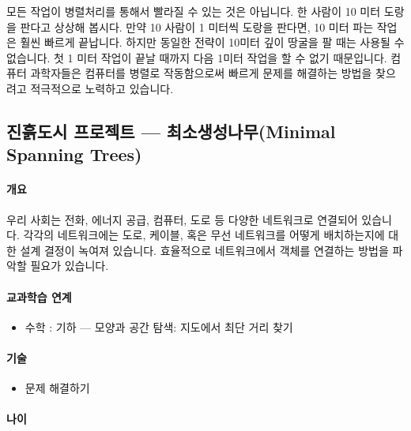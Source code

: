 \documentclass[]{article}
\begin{document}
모든 작업이 병렬처리를 통해서 빨라질 수 있는 것은 아닙니다. 한 사람이 10
미터 도랑을 판다고 상상해 봅시다. 만약 10 사람이 1 미터씩 도랑을 판다면,
10 미터 파는 작업은 훨씬 빠르게 끝납니다. 하지만 동일한 전략이 10미터
깊이 땅굴을 팔 때는 사용될 수 없습니다. 첫 1 미터 작업이 끝날 때까지
다음 1미터 작업을 할 수 없기 때문입니다. 컴퓨터 과학자들은 컴퓨터를
병렬로 작동함으로써 빠르게 문제를 해결하는 방법을 찾으려고 적극적으로
노력하고 있습니다.

\subsection{진흙도시 프로젝트 --- 최소생성나무(Minimal Spanning
Trees)}\label{mdash-minimal-spanning-trees}

\mbox{}\paragraph{개요}\label{section-122}

우리 사회는 전화, 에너지 공급, 컴퓨터, 도로 등 다양한 네트워크로
연결되어 있습니다. 각각의 네트워크에는 도로, 케이블, 혹은 무선
네트워크를 어떻게 배치하는지에 대한 설계 결정이 녹여져 있습니다.
효율적으로 네트워크에서 객체를 연결하는 방법을 파악할 필요가 있습니다.

\mbox{}\paragraph{교과학습 연계}\label{section-123}

\begin{itemize}
\itemsep1pt\parskip0pt
\item
  수학 : 기하 --- 모양과 공간 탐색: 지도에서 최단 거리 찾기
\end{itemize}

\mbox{}\paragraph{기술}\label{section-124}

\begin{itemize}
\itemsep1pt\parskip0pt
\item
  문제 해결하기
\end{itemize}

\mbox{}\paragraph{나이}\label{section-125}
\end{document}
